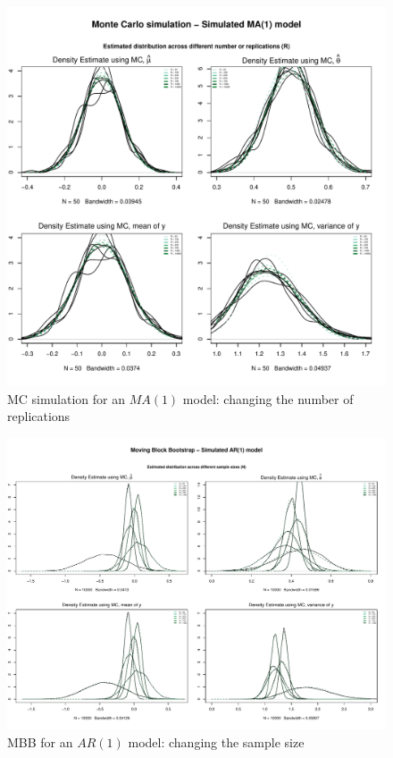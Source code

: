 \documentclass{article}
\begin{document}
\begin{figure}[hbt!]
\includegraphics[width=\textwidth]{plots/MC_MA1_densities_diff_norepl}
\caption{MC simulation for an $MA(1)$ model: changing the number of replications}
\label{fig:MC_MA1_densities_diff_norepl}
\centering
\end{figure}



\clearpage

\begin{figure}[hbt!]
\includegraphics[width=\textwidth]{plots/MBB_AR1_densities_diff_smpl}
\caption{MBB for an $AR(1)$ model: changing the sample size}
\label{fig:MBB_AR1_densities_diff_smpl}
\centering
\end{figure}
\end{document}
